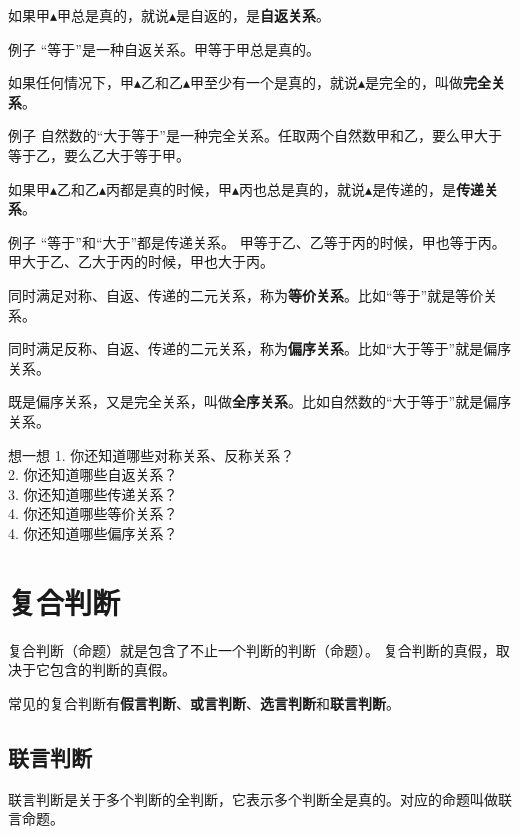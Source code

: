 \documentclass[12pt,UTF8,a4paper]{article}
\begin{document}
如果甲$\blacktriangle$甲总是真的，就说$\blacktriangle$是自返的，是\textbf{自返关系}。

\begin{blockin}{例子}
    “等于”是一种自返关系。甲等于甲总是真的。
\end{blockin}

如果任何情况下，甲$\blacktriangle$乙和乙$\blacktriangle$甲至少有一个是真的，就说$\blacktriangle$是完全的，叫做\textbf{完全关系}。

\begin{blockin}{例子}
    自然数的“大于等于”是一种完全关系。任取两个自然数甲和乙，要么甲大于等于乙，要么乙大于等于甲。
\end{blockin}

如果甲$\blacktriangle$乙和乙$\blacktriangle$丙都是真的时候，甲$\blacktriangle$丙也总是真的，就说$\blacktriangle$是传递的，是\textbf{传递关系}。

\begin{blockin}{例子}
    “等于”和“大于”都是传递关系。
    甲等于乙、乙等于丙的时候，甲也等于丙。
    甲大于乙、乙大于丙的时候，甲也大于丙。
\end{blockin}

同时满足对称、自返、传递的二元关系，称为\textbf{等价关系}。比如“等于”就是等价关系。

同时满足反称、自返、传递的二元关系，称为\textbf{偏序关系}。比如“大于等于”就是偏序关系。

既是偏序关系，又是完全关系，叫做\textbf{全序关系}。比如自然数的“大于等于”就是偏序关系。

\begin{blockaft}{想一想}
    1. 你还知道哪些对称关系、反称关系？\\
    2. 你还知道哪些自返关系？ \\
    3. 你还知道哪些传递关系？\\
    4. 你还知道哪些等价关系？\\
    4. 你还知道哪些偏序关系？
\end{blockaft}

\section{复合判断}

复合判断（命题）就是包含了不止一个判断的判断（命题）。
复合判断的真假，取决于它包含的判断的真假。

常见的复合判断有\textbf{假言判断}、\textbf{或言判断}、\textbf{选言判断}和\textbf{联言判断}。


\subsection{联言判断}
联言判断是关于多个判断的全判断，它表示多个判断全是真的。对应的命题叫做联言命题。
\end{document}
